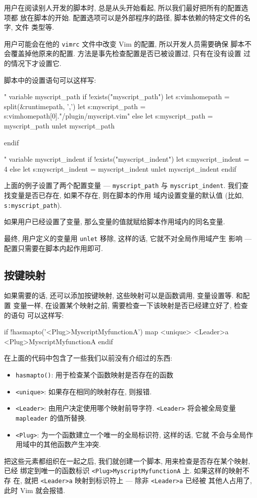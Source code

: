 用户在阅读别人开发的脚本时, 总是从头开始看起, 所以我们最好把所有的配置选项都
放在脚本的开始. 配置选项可以是外部程序的路径, 脚本依赖的特定文件的名字, 文件
类型等.

用户可能会在他的 \texttt{vimrc} 文件中改变 Vim 的配置, 所以开发人员需要确保
脚本不会覆盖掉他原来的配置. 方法是事先检查配置是否已被设置过, 只有在没有设置
过的情况下才设置它.

脚本中的设置语句可以这样写:
\begin{vimcode}
" variable myscript_path
if !exists("myscript_path")
    let s:vimhomepath = split(&runtimepath, ',')
    let s:myscript_path = s:vimhomepath[0]."/plugin/myscript.vim"
else
    let s:myscript_path = myscript_path
    unlet myscript_path
\end{vimcode}
\begin{vimcode}
endif

" variable myscript_indent
if !exists("myscript_indent")
    let s:myscript_indent = 4
else
    let s:myscript_indent = myscript_indent
    unlet myscript_indent
endif
\end{vimcode}
上面的例子设置了两个配置变量 --- \texttt{myscript\_path} 与
\texttt{myscript\_indent}. 我们查找变量是否已存在, 如果不存在, 则在脚本的作用
域内设置变量的默认值 (比如, \texttt{s:myscript\_path}).

如果用户已经设置了变量, 那么变量的值就赋给脚本作用域内的同名变量.

最终, 用户定义的变量用 \texttt{unlet} 移除, 这样的话, 它就不对全局作用域产生
影响 --- 配置只需要在脚本内起作用即可.

\subsection{按键映射}
\label{subsec:key_mappings}

如果需要的话, 还可以添加按键映射, 这些映射可以是函数调用, 变量设置等. 和配置
变量一样, 在设置某个映射之前, 需要检查一下该映射是否已经建立好了, 检查的语句
可以这样写:
\begin{vimcode}
if !hasmapto('<Plug>MyscriptMyfunctionA')
    map <unique> <Leader>a <Plug>MyscriptMyfunctionA
endif
\end{vimcode}
在上面的代码中包含了一些我们以前没有介绍过的东西:
\begin{itemize}
    \item \texttt{hasmapto()}: 用于检查某个函数映射是否存在的函数
    \item \texttt{<unique>}: 如果存在相同的映射存在, 则报错.
    \item \texttt{<Leader>}: 由用户决定使用哪个映射前导字符. \texttt{<Leader>}
        将会被全局变量 \texttt{mapleader} 的值所替换.
    \item \texttt{<Plug>}: 为一个函数建立一个唯一的全局标识符, 这样的话, 它就
        不会与全局作用域中的其他函数产生冲突.
\end{itemize}
把这些元素都组织在一起之后, 我们就创建一个脚本, 用来检查是否存在某个映射, 已经
绑定到唯一的函数标识 \texttt{<Plug>MyscriptMyfunctionA} 上. 如果这样的映射不存
在, 就把 \texttt{<Leader>a} 映射到标识符上 --- 除非 \texttt{<Leader>a} 已经被
其他人占用了, 此时 Vim 就会报错.

